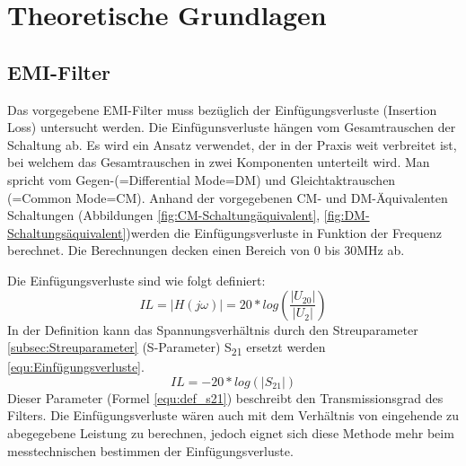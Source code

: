 \section{Theoretische Grundlagen} \label{sec:TheoretischeGrundlagen}

\subsection{EMI-Filter} \label{subsec:emifilter}
Das vorgegebene EMI-Filter muss bezüglich der Einfügungsverluste (Insertion Loss) untersucht werden. Die Einfügunsverluste hängen vom Gesamtrauschen der Schaltung ab. Es wird ein Ansatz verwendet, der in der Praxis weit verbreitet ist, bei welchem das Gesamtrauschen in zwei Komponenten unterteilt wird. Man spricht vom Gegen-(=Differential Mode=DM) und Gleichtaktrauschen (=Common Mode=CM). Anhand der vorgegebenen CM- und DM-Äquivalenten Schaltungen (Abbildungen \ref{fig:CM-Schaltungäquivalent}, \ref{fig:DM-Schaltungsäquivalent})werden die Einfügungsverluste in Funktion der Frequenz berechnet. Die Berechnungen decken einen Bereich von 0 bis 30MHz ab. 

Die Einfügungsverluste sind wie folgt definiert: 
\begin{equation}\label{equ:Freqgang}
	IL = \left\lvert H(j\omega) \right\rvert = 20*log(\frac{ \left\lvert U_{20} \right\rvert }{ \left\lvert U_2 \right\rvert })
\end{equation}
In der Definition kann das Spannungsverhältnis durch den Streuparameter \ref{subsec:Streuparameter} (S-Parameter) S\textsubscript{21} ersetzt werden \ref{equ:Einfügungsverluste}.
\begin{equation}\label{equ:Einfügungsverluste}
	IL = -20*log (\left\lvert S_{21} \right\rvert)
\end{equation}
 Dieser Parameter (Formel \ref{equ:def_s21}) beschreibt den Transmissionsgrad des Filters. Die Einfügungsverluste wären auch mit dem Verhältnis von eingehende zu abegegebene Leistung zu berechnen, jedoch eignet sich diese Methode mehr beim messtechnischen bestimmen der Einfügungsverluste. 
\newpage
